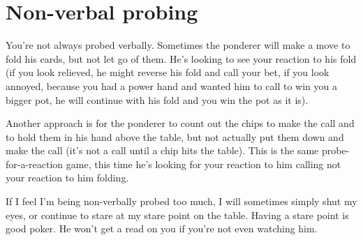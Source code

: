 \section{Non-verbal probing}

You're not always probed verbally. Sometimes the ponderer
will make a move to fold his cards, but not let go of them. He's looking
to see your reaction to his fold (if you look relieved, he might reverse
his fold and call your bet, if you look annoyed, because you had a power
hand and wanted him to call to win you a bigger pot, he will continue
with his fold and you win the pot as it is).

Another approach is for the ponderer to count out the chips to make
the call and to hold them in his hand above the table, but not
actually put them down and make the call (it's not a call until a chip
hits the table). This is the same probe-for-a-reaction game, this time
he's looking for your reaction to him calling not your reaction to him
folding.

If I feel I'm being non-verbally probed too much, I will sometimes
simply shut my eyes, or continue to stare at my stare point on the
table. Having a stare point is good poker. He won't get a read on
you if you're not even watching him.
